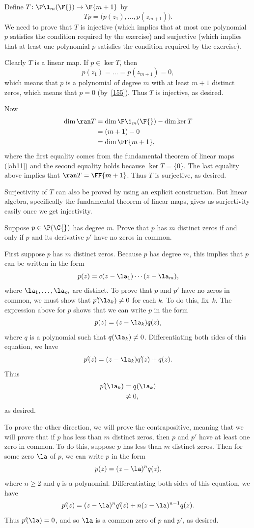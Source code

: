 \begin{Solution}
Define $T \colon \P\1_m(\F{}) \to \F{m+1}$ by
\[
Tp = \bigl(p(z_1), \dots, p(z_{m+1})\bigr).
\]
We need to prove that $T$ is injective (which implies that at most one
polynomial $p$ satisfies the condition required by the exercise) and surjective
(which implies that at least one polynomial $p$ satisfies the condition required
by the exercise).

Clearly $T$ is a linear map.  If $p \in \ker T$, then
\[
p(z_1) = \dots = p(z_{m+1}) = 0,
\]
which means that $p$ is a polynomial of degree $m$ with at least $m+1$ distinct
zeros, which means that $p = 0$ (by~\ref{155}).  Thus $T$ is injective, as
desired.

Now
\begin{align*}
\dim \ran T &= \dim \P\1_m(\F{}) - \dim \ker T \\
&= (m + 1) - 0 \\
&= \dim \FF{m+1},
\end{align*}
where the first equality comes from the fundamental theorem of linear maps (\ref{ab11}) and the second equality holds
because $\ker T = \{0\}$.  The last equality above implies that
$\ran T = \FF{m + 1}$.  Thus $T$ is surjective, as desired.

\Comment
Surjectivity of $T$ can also be proved by using an explicit construction.  But
linear algebra, specifically the fundamental theorem of linear maps, gives us surjectivity easily once we get
injectivity.
\end{Solution}

\exercise
Suppose $p \in \P(\C{})$ has degree $m$.  Prove that $p$ has $m$ distinct zeros if
and only if $p$ and its derivative $p'$ have no zeros in common.

\begin{Solution}
First suppose $p$ has $m$ distinct zeros.  Because $p$ has degree $m$, this
implies that $p$ can be written in the form
\[
p(z) = c (z - \la_1) \dotsm (z - \la_m),
\]
where $\la_1, \dots, \la_m$ are distinct.  To prove that $p$ and $p'$ have no
zeros in common, we must show that $p' \! (\la_k) \ne 0$ for each $k$.  To do this,
fix~$k$.  The expression above for $p$ shows that we can write $p$ in the form
\[
p(z) = (z - \la_k) q(z),
\]
where $q$ is a polynomial such that $q(\la_k) \ne 0$.  Differentiating both sides
of this equation, we have
\[
p' \! (z) = (z - \la_k) q' \! (z) + q(z).
\]
Thus
\begin{align*}
p' \! (\la_k) &= q(\la_k) \\
&\ne 0,
\end{align*}
as desired.

To prove the other direction, we will prove the contrapositive, meaning that we
will prove that if $p$ has less than $m$ distinct zeros, then $p$ and $p'$ have at
least one zero in common.  To do this, suppose $p$ has less than $m$ distinct
zeros.  Then for some zero $\la$ of $p$, we can write $p$ in the form
\[
p(z) = (z - \la)^n q(z),
\]
where $n \ge 2$ and $q$ is a polynomial.  Differentiating both sides
of this equation, we have
\[
p' \! (z) = (z - \la)^n q' \! (z) + n (z - \la)^{n-1} q(z).
\]
Thus $p' \! (\la) = 0$, and so $\la$ is a common zero of $p$ and $p'\!$, as desired.
\end{Solution}

